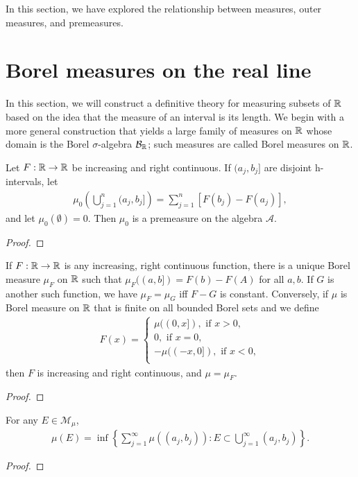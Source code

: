 In this section, we have explored the relationship between measures, outer measures, and premeasures.

\section{Borel measures on the real line}

In this section, we will construct a definitive theory for measuring subsets of $\mathbb{R}$ based on the idea that the measure of an interval is its length.
We begin with a more general construction that yields a large family of measures on $\mathbb{R}$ whose domain is the Borel $\sigma$-algebra $\mathcal{B}_{\mathbb{R}}$; such measures are called Borel measures on $\mathbb{R}$.

\begin{proposition}
    Let $F:\mathbb{R} \to \mathbb{R}$ be increasing and right continuous.
    If $(a_j, b_j]$ are disjoint h-intervals, let
    \begin{align}
        \mu_0 \left(\bigcup_{j=1}^{n} (a_j, b_j] \right) = \sum_{j=1}^{n} [F(b_j) - F(a_j)],
    \end{align}
    and let $\mu_0(\emptyset) = 0$.
    Then $\mu_0$ is a premeasure on the algebra $\mathcal{A}$.
\end{proposition}

\begin{proof}

\end{proof}

\begin{theorem}
    If $F: \mathbb{R} \to \mathbb{R}$ is any increasing, right continuous function, there is a unique Borel measure $\mu_F$ on $\mathbb{R}$ such that $\mu_F ((a,b]) = F(b) - F(A)$ for all $a, b$.
    If $G$ is another such function, we have $\mu_F = \mu_G$ iff $F-G$ is constant.
    Conversely, if $\mu$ is Borel measure on $\mathbb{R}$ that is finite on all bounded Borel sets and we define
    \begin{align}
        F(x) = \begin{cases}
            \mu((0, x]), \text{ if } x > 0, \\
            0, \text{ if } x = 0,\\
            -\mu((-x, 0]), \text{ if } x < 0, \\
        \end{cases}
    \end{align}
    then $F$ is increasing and right continuous, and $\mu = \mu_F$.
\end{theorem}

\begin{proof}
    
\end{proof}

\begin{lemma}
    For any $E \in \mathcal{M}_{\mu}$, 
    \begin{align}
        \mu(E) = \inf \left\{ \sum_{j=1}^{\infty} \mu((a_j, b_j)): E \subset \bigcup_{j=1}^{\infty} (a_j, b_j) \right\}.
    \end{align}
\end{lemma}

\begin{proof}
    
\end{proof}
